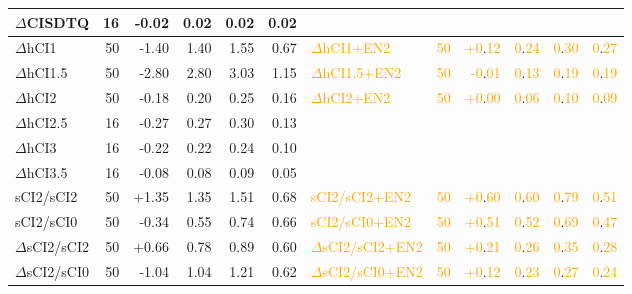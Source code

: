 \documentclass[aip,jcp,reprint,noshowkeys,superscriptaddress]{revtex4-1}
\newcommand{\fk}[1]{\textcolor{orange}{#1}}
\begin{document}
\begin{table}[ht!]
\begin{ruledtabular}
\begin{tabular}{ldddddlddddd}
$\Delta$CISDTQ    & 16  & -0.02 & 0.02 & 0.02 & 0.02  & & & & & & \\
%
\hline
$\Delta$hCI1      & 50  & -1.40 & 1.40 & 1.55 & 0.67  &\fk{$\Delta$hCI1+EN2}      & \fk{50}  & \fk{+0}.\fk{12}  & \fk{0}.\fk{24} & \fk{0}.\fk{30} & \fk{0}.\fk{27} \\
$\Delta$hCI1.5    & 50  & -2.80 & 2.80 & 3.03 & 1.15  &\fk{$\Delta$hCI1.5+EN2}    & \fk{50}  & \fk{-0}.\fk{01}  & \fk{0}.\fk{13} & \fk{0}.\fk{19} & \fk{0}.\fk{19} \\
$\Delta$hCI2      & 50  & -0.18 & 0.20 & 0.25 & 0.16  &\fk{$\Delta$hCI2+EN2}      & \fk{50}  & \fk{+0}.\fk{00}  & \fk{0}.\fk{06} & \fk{0}.\fk{10} & \fk{0}.\fk{09} \\
$\Delta$hCI2.5    & 16  & -0.27 & 0.27 & 0.30 & 0.13  & & & & & & \\
$\Delta$hCI3      & 16  & -0.22 & 0.22 & 0.24 & 0.10  & & & & & & \\
$\Delta$hCI3.5    & 16  & -0.08 & 0.08 & 0.09 & 0.05  & & & & & & \\
%
\hline
sCI2/sCI2         & 50  & +1.35 & 1.35 & 1.51 & 0.68  &\fk{sCI2/sCI2+EN2}         & \fk{50}  & \fk{+0}.\fk{60}  & \fk{0}.\fk{60} & \fk{0}.\fk{79} & \fk{0}.\fk{51} \\
sCI2/sCI0         & 50  & -0.34 & 0.55 & 0.74 & 0.66  &\fk{sCI2/sCI0+EN2}         & \fk{50}  & \fk{+0}.\fk{51}  & \fk{0}.\fk{52} & \fk{0}.\fk{69} & \fk{0}.\fk{47} \\
$\Delta$sCI2/sCI2 & 50  & +0.66 & 0.78 & 0.89 & 0.60  &\fk{$\Delta$sCI2/sCI2+EN2} & \fk{50}  & \fk{+0}.\fk{21}  & \fk{0}.\fk{26} & \fk{0}.\fk{35} & \fk{0}.\fk{28} \\
$\Delta$sCI2/sCI0 & 50  & -1.04 & 1.04 & 1.21 & 0.62  &\fk{$\Delta$sCI2/sCI0+EN2} & \fk{50}  & \fk{+0}.\fk{12}  & \fk{0}.\fk{23} & \fk{0}.\fk{27} & \fk{0}.\fk{24} \\
%
\end{tabular}
\end{ruledtabular}
\end{table}
\end{document}
